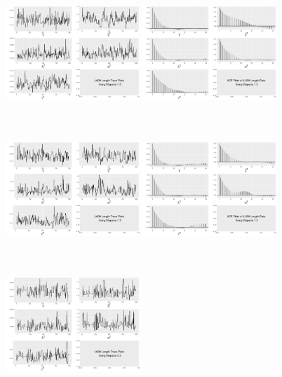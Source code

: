 \begin{figure}[h]
\centering
\includegraphics[width=0.45\textwidth,height=5cm]{Chapters/05MCMCOU/plots/gg1k1chain.pdf}
\includegraphics[width=0.45\textwidth,height=5cm]{Chapters/05MCMCOU/plots/gg1k1acf.pdf}
\includegraphics[width=0.45\textwidth,height=5cm]{Chapters/05MCMCOU/plots/gg1k13chain.pdf}
\includegraphics[width=0.45\textwidth,height=5cm]{Chapters/05MCMCOU/plots/gg1k13acf.pdf}
\includegraphics[width=0.45\textwidth,height=5cm]{Chapters/05MCMCOU/plots/gg1k22chain.pdf}

\end{figure}
